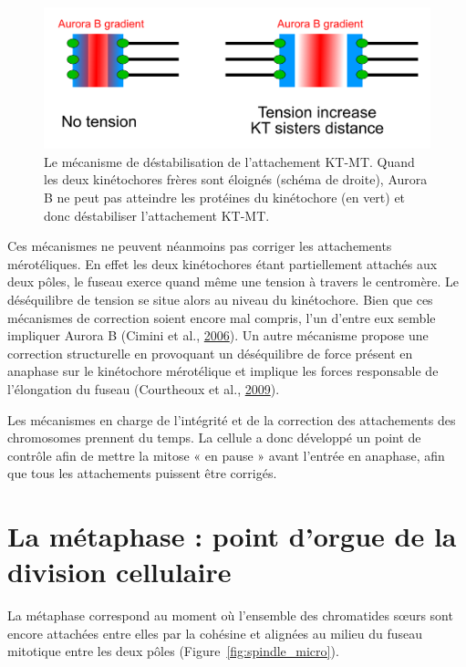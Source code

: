 \documentclass[12pt,a4paper,twoside,openright]{book}
\begin{document}
\begin{figure}[htbp]
\centering
\includegraphics{figures/intro/aurora.png}
\caption[Le mécanisme de déstabilisation de l'attachement KT-MT]{\label{fig:aurora}Le
mécanisme de déstabilisation de l'attachement KT-MT. Quand les deux
kinétochores frères sont éloignés (schéma de droite), Aurora B ne peut
pas atteindre les protéines du kinétochore (en vert) et donc
déstabiliser l'attachement KT-MT.}
\end{figure}

Ces mécanismes ne peuvent néanmoins pas corriger les attachements
mérotéliques. En effet les deux kinétochores étant partiellement
attachés aux deux pôles, le fuseau exerce quand même une tension à
travers le centromère. Le déséquilibre de tension se situe alors au
niveau du kinétochore. Bien que ces mécanismes de correction soient
encore mal compris, l'un d'entre eux semble impliquer Aurora B (Cimini
et al., \hyperref[ref-Cimini2006]{2006}). Un autre mécanisme propose une
correction structurelle en provoquant un déséquilibre de force présent
en anaphase sur le kinétochore mérotélique et implique les forces
responsable de l'élongation du fuseau (Courtheoux et al.,
\hyperref[ref-Courtheoux2009]{2009}).

Les mécanismes en charge de l'intégrité et de la correction des
attachements des chromosomes prennent du temps. La cellule a donc
développé un point de contrôle afin de mettre la mitose « en pause »
avant l'entrée en anaphase, afin que tous les attachements puissent être
corrigés.

\section{La métaphase : point d'orgue de la division
cellulaire}\label{la-muxe9taphase-point-dorgue-de-la-division-cellulaire}

La métaphase correspond au moment où l'ensemble des chromatides sœurs
sont encore attachées entre elles par la cohésine et alignées au milieu
du fuseau mitotique entre les deux pôles
(Figure~\ref{fig:spindle_micro}).
\end{document}
